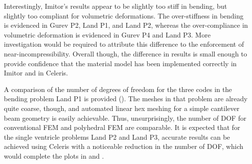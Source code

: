 Interestingly, Imitor's results appear to be slightly too stiff in bending, but slightly too compliant for volumetric deformations. The over-stiffness in bending is evidenced in Gurev P2, Land P1, and Land P2, whereas the over-compliance in volumetric deformation is evidenced in Gurev P4 and Land P3. More investigation would be required to attribute this difference to the enforcement of near-incompressibility. Overall though, the difference in results is small enough to provide confidence that the material model has been implemented correctly in Imitor and in Celeris.

A comparison of the number of degrees of freedom for the three codes in the bending problem Land P1 is provided (). The meshes in that problem are already quite coarse, though, and automated linear hex meshing for a simple cantilever beam geometry is easily achievable. Thus, unsurprisingly, the number of DOF for conventional FEM and polyhedral FEM are comparable. It is expected that for the single ventricle problems Land P2 and Land P3, accurate results can be achieved using Celeris with a noticeable reduction in the number of DOF, which would complete the plots in  and .

